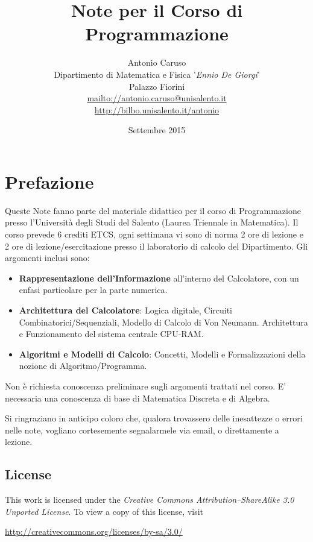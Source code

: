 \documentclass[a4paper]{book}
\title{Note per il Corso di Programmazione}
\author{Antonio Caruso\\[2ex] 
 {\normalsize Dipartimento di Matematica e Fisica '\emph{Ennio De Giorgi}'\\   
              Palazzo Fiorini\\[2ex] 
 \url{mailto://antonio.caruso@unisalento.it}\\
 \url{http://bilbo.unisalento.it/antonio}}}
\date{Settembre 2015}
\makeatletter
\renewcommand\maketitle{
\begin{titlepage} \vspace*{\stretch{1}}
 \begin{center} {\Huge \@title \par}%
	 \vspace{5em}%
	 {\LARGE \@author \par}%
	 \vspace{1.5em} {
	 \large \emph{\@date} \par}%
	 \end{center}%
 \vspace*{\stretch{1}} 
\end{titlepage}}
\newcommand{\uchapter}[1]{\chapter*{#1}\phantomsection\addcontentsline{toc}{chapter}{#1}}
\makeatother
\begin{document}
\frontmatter

\hypersetup{pageanchor=false}
\pagestyle{empty} 
\maketitle
\tableofcontents

\uchapter{Prefazione}

Queste Note fanno parte del materiale didattico per il corso di Programmazione presso l'Università degli Studi del Salento (Laurea Triennale in Matematica). 
Il corso prevede 6 crediti ETCS, ogni settimana vi sono di norma 2 ore di lezione e 2 ore di lezione/esercitazione presso il laboratorio di calcolo del Dipartimento.
Gli argomenti inclusi sono:
\begin{itemize}
\item \textbf{Rappresentazione dell'Informazione} all'interno del Calcolatore, con un enfasi particolare per la parte numerica.
\item \textbf{Architettura del Calcolatore}: Logica digitale, Circuiti Combinatorici/Sequenziali, Modello di Calcolo di Von Neumann. Architettura e Funzionamento del sistema centrale CPU-RAM.
\item \textbf{Algoritmi e Modelli di Calcolo}: Concetti, Modelli e Formalizzazioni della nozione di Algoritmo/Programma.  
\end{itemize}
Non è richiesta conoscenza preliminare sugli argomenti trattati nel corso. E' necessaria una conoscenza di base di Matematica Discreta e di Algebra.

Si ringraziano in anticipo coloro che, qualora trovassero delle inesattezze o errori nelle note, vogliano cortesemente segnalarmele via email, o direttamente a lezione.
\section*{License}
\begin{samepage}
This work is licensed under the \emph{Creative Commons Attribution--ShareAlike 3.0 Unported License}. To view a copy of this license, visit
\begin{center}
    \url{http://creativecommons.org/licenses/by-sa/3.0/}
\end{center}
\end{samepage}

\mainmatter
\pagestyle{fancy} 






\end{document}
